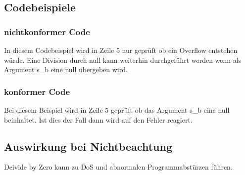 \documentclass[12pt]{article}
\begin{document}
\subsection{Codebeispiele}
\subsubsection{nichtkonformer Code}


In diesem Codebeispiel wird in Zeile 5 nur geprüft ob ein Overflow entstehen würde. Eine Division durch null kann weiterhin durchgeführt werden wenn als Argument s_b eine null übergeben wird.

 
\subsubsection{konformer Code}


Bei diesem Beispiel wird in Zeile 5 geprüft ob das Argument s_b eine null beinhaltet. Ist dies der Fall dann wird auf den Fehler reagiert.

\subsection{Auswirkung bei Nichtbeachtung}
Deivide by Zero kann zu DoS und abnormalen Programmabstürzen  führen.
\end{document}

